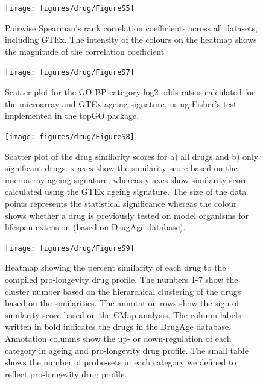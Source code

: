 \documentclass[12pt,twoside]{unicam}
\begin{document}
\begin{figure}

{\centering \texttt{[image: figures/drug/FigureS5]} 

}

\caption[Pairwise correlations across all datasets.]{Pairwise Spearman's rank correlation coefficients across all datasets, including GTEx. The intensity of the colours on the heatmap shows the magnitude of the correlation coefficient}\label{fig:drugFigS5}
\end{figure}

\begin{figure}

{\centering \texttt{[image: figures/drug/FigureS7]} 

}

\caption[GO BP Category enrichment score distributions for ageing signatures.]{Scatter plot for the GO BP category log2 odds ratios calculated for the microarray and GTEx ageing signature, using Fisher's test implemented in the topGO package.}\label{fig:drugFigS7}
\end{figure}

\begin{figure}

{\centering \texttt{[image: figures/drug/FigureS8]} 

}

\caption[Correlation between CMap results generated using the microarray and GTEx ageing signatures.]{Scatter plot of the drug similarity scores for a) all drugs and b) only significant drugs. x-axes show the similarity score based on the microarray ageing signature, whereas y-axes show similarity score calculated using the GTEx ageing signature. The size of the data points represents the statistical significance whereas the colour shows whether a drug is previously tested on model organisms for lifespan extension (based on DrugAge database).}\label{fig:drugFigS8}
\end{figure}

\begin{figure}

{\centering \texttt{[image: figures/drug/FigureS9]} 

}

\caption[Heatmap showing the percent similarity of each drug to the compiled pro-longevity drug profile.]{Heatmap showing the percent similarity of each drug to the compiled pro-longevity drug profile. The numbers 1-7 show the cluster number based on the hierarchical clustering of the drugs based on the similarities. The annotation rows show the sign of similarity score based on the CMap analysis. The column labels written in bold indicates the drugs in the DrugAge database. Annotation columns show the up- or down-regulation of each category in ageing and pro-longevity drug profile. The small table shows the number of probe-sets in each category we defined to reflect pro-longevity drug profile.}\label{fig:drugFigS9}
\end{figure}
\end{document}
